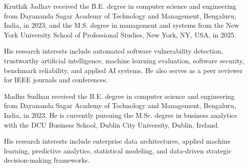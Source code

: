 \documentclass{ieeeaccess}
\begin{document}
\begin{IEEEbiographynophoto}{Kruthik Jadhav}
received the B.E. degree in computer science and engineering from Dayananda Sagar Academy of Technology and Management, Bengaluru, India, in 2023, and the M.S. degree in management and systems from the New York University School of Professional Studies, New York, NY, USA, in 2025.

His research interests include automated software vulnerability detection, trustworthy artificial intelligence, machine learning evaluation, software security, benchmark reliability, and applied AI systems. He also serves as a peer reviewer for IEEE journals and conferences.
\end{IEEEbiographynophoto}

\begin{IEEEbiographynophoto}{Madhu Sudhan}
received the B.E. degree in computer science and engineering from Dayananda Sagar Academy of Technology and Management, Bengaluru, India, in 2023. He is currently pursuing the M.Sc. degree in business analytics with the DCU Business School, Dublin City University, Dublin, Ireland.

His research interests include enterprise data architectures, applied machine learning, predictive analytics, statistical modeling, and data-driven strategic decision-making frameworks.
\end{IEEEbiographynophoto}

\vfill

\EOD
\end{document}
